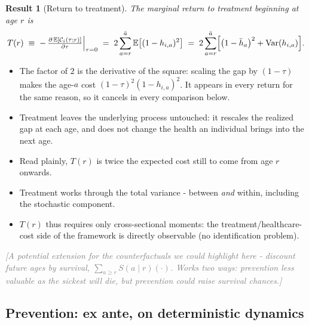 \documentclass[11pt]{article}
\newtheorem{result}{Result}
\theoremstyle{remark}
\newcommand{\jnote}[1]{\textcolor{gray}{\textit{[#1]}}}
\newcommand{\E}{\mathbb{E}}
\newcommand{\Var}{\mathrm{Var}}
\begin{document}
\begin{result}[Return to treatment]\label{res:treat}
The marginal return to treatment beginning at age $r$ is
\begin{equation}
T(r) \;\equiv\; -\,\tfrac{\partial\,\E[\mathcal{C}_i(\tau;r)]}{\partial\tau}\Big|_{\tau=0}
\;=\; 2\sum_{a=r}^{\bar a}\E\bigl[(1-h_{i,a})^2\bigr]
\;=\; 2\sum_{a=r}^{\bar a}\Bigl[\bigl(1-\bar h_a\bigr)^2+\Var(h_{i,a})\Bigr].
\end{equation}
\end{result}

\begin{itemize}
\item The factor of $2$ is the derivative of the square: scaling the gap by $(1-\tau)$ makes the age-$a$ cost $(1-\tau)^2(1-h_{i,a})^2$.
It appears in every return for the same reason, so it cancels in every comparison below.
\item Treatment leaves the underlying process untouched: it rescales the realized gap at each age, and does not change the health an individual brings into the next age.
\item Read plainly, $T(r)$ is twice the expected cost still to come from age $r$ onwards.
\item Treatment works through the total variance - between \emph{and} within, including the stochastic component.
\item $T(r)$ thus requires only cross-sectional moments: the treatment/healthcare-cost side of the framework is directly observable (no identification problem).
\end{itemize}

\jnote{A potential extension for the counterfactuals we could highlight here - discount future ages by survival, $\sum_{a\ge r}S(a\mid r)(\cdot)$.
Works two ways: prevention less valuable as the sickest will die, but prevention could raise survival chances.}

\subsection{Prevention: ex ante, on deterministic dynamics}\label{sec:prevention}
\end{document}
